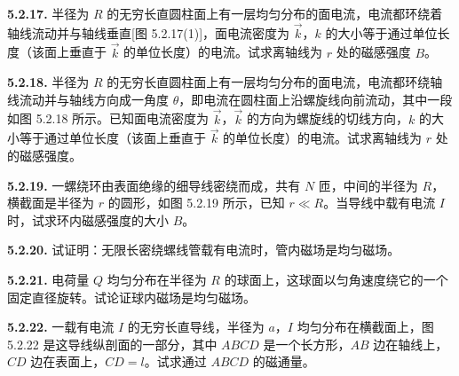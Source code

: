 \begin{center}
\end{center}

\vfill
\newpage

\textbf{5.2.17.} 半径为 $R$ 的无穷长直圆柱面上有一层均匀分布的面电流，电流都环绕着轴线流动并与轴线垂直[图 5.2.17(1)]，面电流密度为 $\vec{k}$，$k$ 的大小等于通过单位长度（该面上垂直于 $\vec{k}$ 的单位长度）的电流。试求离轴线为 $r$ 处的磁感强度 $B$。

\begin{center}
\end{center}

\vfill
\newpage

\textbf{5.2.18.} 半径为 $R$ 的无穷长直圆柱面上有一层均匀分布的面电流，电流都环绕轴线流动并与轴线方向成一角度 $\theta$，即电流在圆柱面上沿螺旋线向前流动，其中一段如图 5.2.18 所示。已知面电流密度为 $\vec{k}$，$\vec{k}$ 的方向为螺旋线的切线方向，$k$ 的大小等于通过单位长度（该面上垂直于 $\vec{k}$ 的单位长度）的电流。试求离轴线为 $r$ 处的磁感强度。

\begin{center}
\end{center}

\vfill
\newpage

\textbf{5.2.19.} 一螺绕环由表面绝缘的细导线密绕而成，共有 $N$ 匝，中间的半径为 $R$，横截面是半径为 $r$ 的圆形，如图 5.2.19 所示，已知 $r \ll R$。当导线中载有电流 $I$ 时，试求环内磁感强度的大小 $B$。

\begin{center}
\end{center}

\vfill
\newpage

\textbf{5.2.20.} 试证明：无限长密绕螺线管载有电流时，管内磁场是均匀磁场。

\vfill
\newpage

\textbf{5.2.21.} 电荷量 $Q$ 均匀分布在半径为 $R$ 的球面上，这球面以匀角速度绕它的一个固定直径旋转。试论证球内磁场是均匀磁场。

\vfill
\newpage

\textbf{5.2.22.} 一载有电流 $I$ 的无穷长直导线，半径为 $a$，$I$ 均匀分布在横截面上，图 5.2.22 是这导线纵剖面的一部分，其中 $ABCD$ 是一个长方形，$AB$ 边在轴线上，$CD$ 边在表面上，$CD = l$。试求通过 $ABCD$ 的磁通量。

